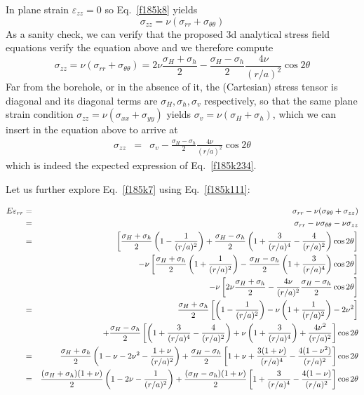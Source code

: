 In plane strain $\varepsilon_{zz}=0$ so Eq.~\eqref{f185k8} yields
\begin{equation}
\sigma_{zz}= \nu(\sigma_{rr}+\sigma_{\theta\theta}) \label{f185pszz}
\end{equation}
As a sanity check, we can verify that the proposed 3d analytical stress field equations 
verify the equation above and we therefore compute 
\begin{equation}
\sigma_{zz} 
= \nu(\sigma_{rr}+\sigma_{\theta\theta} )
= 2\nu\frac{\sigma_H+\sigma_h}{2} 
 -\frac{\sigma_H-\sigma_h}{2} \frac{4 \nu}{(r/a)^2}   \cos 2\theta \label{f185k111}
\end{equation}
Far from the borehole, or in the absence of it, the (Cartesian) stress tensor 
is diagonal and its diagonal terms are $\sigma_H,\sigma_h,\sigma_v$ respectively, 
so that the same plane strain condition $\sigma_{zz}= \nu(\sigma_{xx}+\sigma_{yy})$ yields 
$\sigma_{v}= \nu(\sigma_{H}+\sigma_{h})$, which we can insert in the equation above to arrive at 
\begin{eqnarray}
\sigma_{zz} &=& 
\sigma_v  - \frac{\sigma_H-\sigma_h}{2}   \frac{4 \nu}{(r/a)^2}   \cos 2\theta  
\end{eqnarray}
which is indeed the expected expression of Eq.~\eqref{f185k234}.


Let us further explore Eq.~\eqref{f185k7} using Eq.~\eqref{f185k111}:

\begin{eqnarray}
E \varepsilon_{rr} 
&=&  \sigma_{rr}-\nu (\sigma_{\theta\theta} +\sigma_{zz}) \nonumber\\
&=&  \sigma_{rr}-\nu \sigma_{\theta\theta} -\nu \sigma_{zz} \nonumber\\
&=& \left[  \frac{\sigma_H+\sigma_h}{2} \left(1-\frac{1}{(r/a)^2} \right)
+\frac{\sigma_H-\sigma_h}{2}  \left( 1 + \frac{3}{(r/a)^4} - \frac{4}{(r/a)^2}   \right) \cos 2\theta     \right]   \nonumber\\
&& -\nu \left[  \frac{\sigma_H+\sigma_h}{2} \left(1+\frac{1}{(r/a)^2} \right)
-\frac{\sigma_H-\sigma_h}{2} \left( 1 + \frac{3}{(r/a)^4}   \right) \cos 2\theta    \right]   \nonumber\\
&& -\nu \left[ 2 \nu \frac{\sigma_H+\sigma_h}{2} -  \frac{4 \nu}{(r/a)^2}  \frac{\sigma_H-\sigma_h}{2}   \cos 2\theta    \right]   \nonumber\\
&=& \frac{\sigma_H+\sigma_h}{2} \left[  \left(1-\frac{1}{(r/a)^2} \right) -\nu  \left(1+\frac{1}{(r/a)^2} \right)
-2\nu^2 \right] \nonumber\\
&& + \frac{\sigma_H-\sigma_h}{2}
\left[ \left( 1 + \frac{3}{(r/a)^4} - \frac{4}{(r/a)^2}   \right) 
+\nu \left( 1 + \frac{3}{(r/a)^4}   \right) 
+  \frac{4 \nu^2}{(r/a)^2} \right] \cos 2\theta   \nonumber\\
&=& \frac{\sigma_H+\sigma_h}{2} \left(  1 -\nu -2\nu^2 -\frac{1+\nu}{(r/a)^2} \right)   
+ \frac{\sigma_H-\sigma_h}{2}
\left[  1+\nu + \frac{3(1+\nu)}{(r/a)^4} - \frac{4(1-\nu^2)}{(r/a)^2}  
\right] \cos 2\theta \nonumber\\
&=& \frac{(\sigma_H+\sigma_h)(1+\nu)}{2} \left(  1 -2\nu -\frac{1}{(r/a)^2} \right)   
+ \frac{(\sigma_H-\sigma_h)(1+\nu)}{2}
\left[  1 + \frac{3}{(r/a)^4} - \frac{4(1-\nu)}{(r/a)^2}  
\right] \cos 2\theta \nonumber 
\end{eqnarray}


